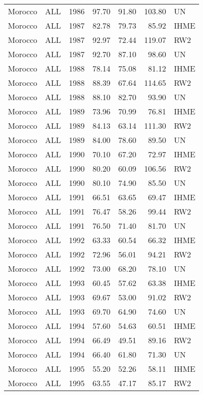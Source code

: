 \begin{longtable}{lllrrrl}
  Morocco & ALL & 1986 & 97.70 & 91.80 & 103.80 & UN \\ 
  Morocco & ALL & 1987 & 82.78 & 79.73 & 85.92 & IHME \\ 
  Morocco & ALL & 1987 & 92.97 & 72.44 & 119.07 & RW2 \\ 
  Morocco & ALL & 1987 & 92.70 & 87.10 & 98.60 & UN \\ 
  Morocco & ALL & 1988 & 78.14 & 75.08 & 81.12 & IHME \\ 
  Morocco & ALL & 1988 & 88.39 & 67.64 & 114.65 & RW2 \\ 
  Morocco & ALL & 1988 & 88.10 & 82.70 & 93.90 & UN \\ 
  Morocco & ALL & 1989 & 73.96 & 70.99 & 76.81 & IHME \\ 
  Morocco & ALL & 1989 & 84.13 & 63.14 & 111.30 & RW2 \\ 
  Morocco & ALL & 1989 & 84.00 & 78.60 & 89.50 & UN \\ 
  Morocco & ALL & 1990 & 70.10 & 67.20 & 72.97 & IHME \\ 
  Morocco & ALL & 1990 & 80.20 & 60.09 & 106.56 & RW2 \\ 
  Morocco & ALL & 1990 & 80.10 & 74.90 & 85.50 & UN \\ 
  Morocco & ALL & 1991 & 66.51 & 63.65 & 69.47 & IHME \\ 
  Morocco & ALL & 1991 & 76.47 & 58.26 & 99.44 & RW2 \\ 
  Morocco & ALL & 1991 & 76.50 & 71.40 & 81.70 & UN \\ 
  Morocco & ALL & 1992 & 63.33 & 60.54 & 66.32 & IHME \\ 
  Morocco & ALL & 1992 & 72.96 & 56.01 & 94.21 & RW2 \\ 
  Morocco & ALL & 1992 & 73.00 & 68.20 & 78.10 & UN \\ 
  Morocco & ALL & 1993 & 60.45 & 57.62 & 63.38 & IHME \\ 
  Morocco & ALL & 1993 & 69.67 & 53.00 & 91.02 & RW2 \\ 
  Morocco & ALL & 1993 & 69.70 & 64.90 & 74.60 & UN \\ 
  Morocco & ALL & 1994 & 57.60 & 54.63 & 60.51 & IHME \\ 
  Morocco & ALL & 1994 & 66.49 & 49.51 & 89.16 & RW2 \\ 
  Morocco & ALL & 1994 & 66.40 & 61.80 & 71.30 & UN \\ 
  Morocco & ALL & 1995 & 55.20 & 52.26 & 58.11 & IHME \\ 
  Morocco & ALL & 1995 & 63.55 & 47.17 & 85.17 & RW2 \\ 

\end{longtable}
